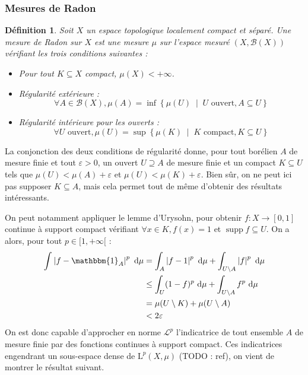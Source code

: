 \documentclass[a4paper,12pt]{article}
\newtheorem{definition}[theorem]{Définition}
\newcommand{\Bor}{\mathcal{B}}
\newcommand{\abs}[1]{\left\vert#1\right\vert}
\newcommand{\set}[1]{\left\{ #1 \right\}}
\newcommand{\indic}{\mathbbm{1}}
\newcommand{\integral}[4]{\int_{#1}^{#2} #3~\mathrm{d}#4}
\newcommand{\tq}{\;\middle|\;}
\newcommand{\TODO}[1]{{\color{red}TODO :} #1}
\DeclareMathOperator{\Supp}{supp}
\begin{document}
\subsubsection*{Mesures de Radon}

\begin{definition}
    Soit $X$ un espace topologique localement compact et séparé. Une \emph{mesure de Radon} sur $X$
    est une mesure $\mu$ sur l'espace mesuré $(X, \Bor(X))$ vérifiant les trois conditions suivantes :
    \begin{itemize}
        \item Pour tout $K\subseteq X$ compact, $\mu(X)<+\infty$.
        \item Régularité extérieure : 
        \begin{equation*}
            \forall A\in\Bor(X), \mu(A) = \inf \set{\mu(U) \tq U\text{ ouvert}, A\subseteq U}
        \end{equation*}
        \item Régularité intérieure pour les ouverts : 
        \begin{equation*}
            \forall U\text{ ouvert}, \mu(U) = \sup \set{\mu(K) \tq K\text{ compact}, K\subseteq U}
        \end{equation*}
    \end{itemize}
\end{definition}

La conjonction des deux conditions de régularité donne, pour tout borélien $A$ de mesure finie et tout $\varepsilon>0$,
un ouvert $U\supseteq A$ de mesure finie et un compact $K\subseteq U$ tels que $\mu(U)<\mu(A)+\varepsilon$ et 
$\mu(U)<\mu(K)+\varepsilon$. Bien sûr, on ne peut ici pas supposer $K\subseteq A$, mais cela permet 
tout de même d'obtenir des résultats intéressants.

On peut notamment appliquer le lemme d'Urysohn, pour obtenir $f:X\to[0,1]$ continue à support compact
vérifiant $\forall x\in K, f(x) = 1$ et $\Supp f\subseteq U$. On a alors, pour tout $p\in[1, +\infty[$ : 
\begin{align*}
    \integral{}{}{\abs{f-\indic_A}^p}{\mu} 
        &= \integral{A}{}{\abs{f-1}^p}{\mu} + \integral{U\setminus A}{}{\abs{f}^p}{\mu} \\
        &\le \integral{U}{}{(1-f)^p}{\mu} + \integral{U\setminus A}{}{f^p}{\mu} \\
        &= \mu(U\setminus K) + \mu(U\setminus A) \\
        &< 2\varepsilon
\end{align*}
On est donc capable d'approcher en norme $\mathscr{L}^p$ l'indicatrice de tout ensemble $A$ de mesure finie par des fonctions continues 
à support compact. Ces indicatrices engendrant un sous-espace dense de $\mathrm{L}^p(X, \mu)$ (\TODO{ref}), on vient de montrer le résultat suivant.
\end{document}
